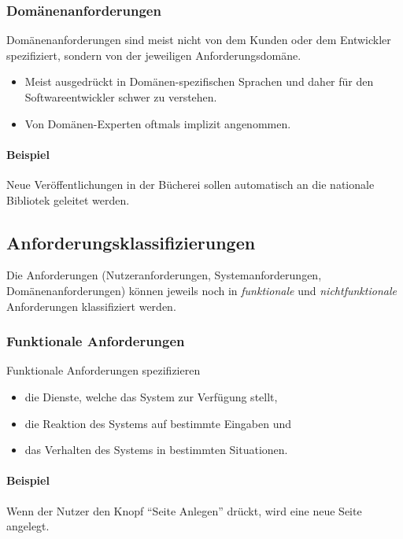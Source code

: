 \documentclass[a4paper, 11pt, accentcolor = tud3b]{tudreport}
\begin{document}
				\subsubsection{Domänenanforderungen}
					Domänenanforderungen sind meist nicht von dem Kunden oder dem Entwickler spezifiziert, sondern von der jeweiligen Anforderungsdomäne.
					
					\begin{itemize}
						\item Meist ausgedrückt in Domänen-spezifischen Sprachen und daher für den Softwareentwickler schwer zu verstehen.
						\item Von Domänen-Experten oftmals implizit angenommen.
					\end{itemize}
					
					\paragraph{Beispiel}
						Neue Veröffentlichungen in der Bücherei sollen automatisch an die nationale Bibliotek geleitet werden.
			
			\subsection{Anforderungsklassifizierungen}
				Die Anforderungen (Nutzeranforderungen, Systemanforderungen, Domänenanforderungen) können jeweils noch in \textit{funktionale} und \textit{nichtfunktionale} Anforderungen klassifiziert werden.
				
				\subsubsection{Funktionale Anforderungen}
					Funktionale Anforderungen spezifizieren
					\begin{itemize}
						\item die Dienste, welche das System zur Verfügung stellt,
						\item die Reaktion des Systems auf bestimmte Eingaben und
						\item das Verhalten des Systems in bestimmten Situationen.
					\end{itemize}
					
					\paragraph{Beispiel}
						Wenn der Nutzer den Knopf \enquote{Seite Anlegen} drückt, wird eine neue Seite angelegt.
				
\end{document}
